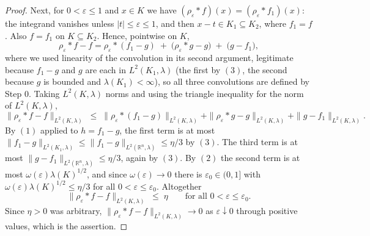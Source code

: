 \begin{proof}
Next, for $0 < \varepsilon \leq 1$ and $x \in K$ we have
$(\rho_\varepsilon * f)(x) = (\rho_\varepsilon * f_1)(x)$: the integrand vanishes
unless $|t| \leq \varepsilon \leq 1$, and then $x - t \in K_1 \subseteq K_2$,
where $f_1 = f$.  Also $f = f_1$ on $K \subseteq K_2$.  Hence, pointwise on $K$,
\[
  \rho_\varepsilon * f - f
    = \rho_\varepsilon * (f_1 - g) \;+\; \bigl(\rho_\varepsilon * g - g\bigr)
      \;+\; \bigl(g - f_1\bigr) ,
\]
where we used linearity of the convolution in its second argument, legitimate
because $f_1 - g$ and $g$ are each in $L^2(K_1,\lambda)$ (the first by $(3)$, the
second because $g$ is bounded and $\lambda(K_1)<\infty$), so all three
convolutions are defined by Step 0.  Taking $L^2(K,\lambda)$ norms and using the
triangle inequality for the norm of $L^2(K,\lambda)$,
\[
  \|\rho_\varepsilon * f - f\|_{L^2(K,\lambda)}
    \;\leq\; \|\rho_\varepsilon * (f_1-g)\|_{L^2(K,\lambda)}
      + \|\rho_\varepsilon * g - g\|_{L^2(K,\lambda)}
      + \|g - f_1\|_{L^2(K,\lambda)} .
\]
By $(1)$ applied to $h = f_1 - g$, the first term is at most
$\|f_1-g\|_{L^2(K_1,\lambda)} \leq \|f_1-g\|_{L^2(\mathbb{R}^n,\lambda)} \leq \eta/3$
by $(3)$.  The third term is at most
$\|g-f_1\|_{L^2(\mathbb{R}^n,\lambda)} \leq \eta/3$, again by $(3)$.  By $(2)$ the
second term is at most $\omega(\varepsilon)\lambda(K)^{1/2}$, and since
$\omega(\varepsilon) \to 0$ there is $\varepsilon_0 \in (0,1]$ with
$\omega(\varepsilon)\lambda(K)^{1/2} \leq \eta/3$ for all
$0 < \varepsilon \leq \varepsilon_0$.  Altogether
\[
  \|\rho_\varepsilon * f - f\|_{L^2(K,\lambda)} \;\leq\; \eta
  \qquad\text{for all } 0 < \varepsilon \leq \varepsilon_0 .
\]
Since $\eta > 0$ was arbitrary, $\|\rho_\varepsilon * f - f\|_{L^2(K,\lambda)} \to 0$
as $\varepsilon \downarrow 0$ through positive values, which is the assertion.
\end{proof}
